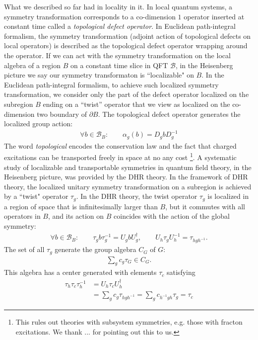 \documentclass{article}
\newcommand{\mB}{\mathcal{B}}
\newcommand{\nn}{\nonumber}
\theoremstyle{definition}
\begin{document}
  What we described so far had in locality in it. In local quantum systems, a
  symmetry transformation corresponds to a co-dimension $1$ operator inserted at
  constant time called a {\it topological defect operator}. In Euclidean path-integral
  formalism, the symmetry transformation (adjoint action of topological defects on
  local operators) is described as the topological defect operator wrapping
  around the operator. If we can act with the symmetry transformation on the local
  algebra of a region $B$ on a constant time slice in QFT $\mB$, in the
  Heisenberg picture we say our symmetry transformaton is ``localizable" on $B$.
  In the Euclidean path-integral formalism, to achieve such localized symmetry transformation,
  we consider only the part of the defect operator localized on the subregion
  $B$ ending on a ``twist'' operator that we view as localized on the co-dimension
  two boundary of $\partial B$. The topological defect operator generates the localized
  group action:
  \begin{align}
    \forall b\in \mB_{B}:\qquad \alpha_{g}(b)=D_{g}b D_{g}^{-1}
  \end{align}
  The word {\it topological} encodes the conservation law and the fact that
  charged excitations can be transported freely in space at no any cost
  \footnote{This rules out theories with subsystem symmetries, e.g. those with
  fracton excitations. We thank ... for pointing out this to us.}. A systematic study
  of localizable and transportable symmetries in quantum field theory, in the
  Heisenberg picture, was provided by the DHR theory. In the framework of DHR
  theory, the localized unitary symmetry transformation on a subregion is achieved
  by a ``twist" operator $\tau_{g}$. In the DHR theory, the twist operator
  $\tau_{g}$ is localized in a region of space that is infinitesimally larger
  than $B$, but it commutes with all operators in $B$, and its action on $B$
  coincides with the action of the global symmetry:
  \begin{align}
    \forall b\in \mB_{B}:\qquad \tau_{g}b \tau_{g}^{-1}=U_{g}b U_{g}^{\dagger},\qquad U_{h}\tau_{g}U_{h}^{-1}=\tau_{h g h^{-1}}.
  \end{align}
  The set of all $\tau_{g}$ generate the group algebra $C_{G}$ of $G$:
  \begin{align}
    \sum_{g}c_{g}\tau_{G}\in C_{G}.
  \end{align}
  This algebra has a center generated with elements $\tau_{c}$ satisfying
  \begin{align}
    \tau_{h}\tau_{c}\tau_{h}^{-1} & =U_{h}\tau_{c}U_{h}^{\dagger}\nn                                       \\
                                  & =\sum_{g}c_{g}\tau_{h g h^{-1}}=\sum_{g}c_{h^{-1}g h}\tau_{g}=\tau_{c}
  \end{align}
\end{document}
